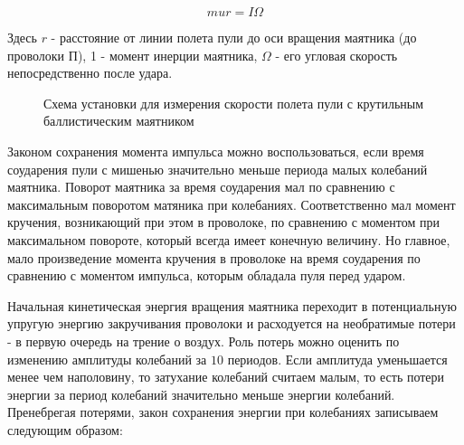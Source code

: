 \documentclass[14pt]{article}
\begin{document}
\begin{equation}
mur = I\Omega
\end{equation}

Здесь $r$ - расстояние от линии полета пули до оси вращения маятника (до проволоки $\text{П}$), 1 - момент инерции маятника, $\Omega$ - его угловая скорость непосредственно после удара.

\begin{figure}[h!]
	\caption{Схема установки для измерения скорости полета пули с крутильным баллистическим маятником}
\end{figure} 

Законом сохранения момента импульса можно воспользоваться, если время соударения пули с мишенью значительно меньше периода малых колебаний маятника. Поворот маятника за время соударения мал по сравнению с максимальным поворотом матяника при колебаниях. Соответственно мал момент кручения, возникающий при этом в проволоке, по сравнению с моментом при максимальном повороте, который всегда имеет конечную величину. Но главное, мало произведение момента кручения в проволоке на время соударения по сравнению с моментом импульса, которым обладала пуля перед ударом.

Начальная кинетическая энергия вращения маятника переходит в потенциальную упругую энергию закручивания проволоки и расходуется на необратимые потери - в первую очередь на трение о воздух. Роль потерь можно оценить по изменению амплитуды колебаний за $10$ периодов. Если амплитуда уменьшается менее чем наполовину, то затухание колебаний считаем малым, то есть потери энергии за период колебаний значительно меньше энергии колебаний. Пренебрегая потерями, закон сохранения энергии при колебаниях записываем следующим образом:
\end{document}
